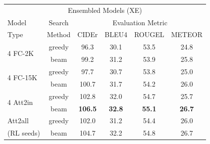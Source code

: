 \documentclass[10pt,twocolumn,letterpaper]{article}
\begin{document}
\begin{table}[t]

\small\addtolength{\tabcolsep}{-2.0pt} 
\begin{tabular}{l|c|cccc}
\hline \hline
\multicolumn{6}{c}{\multirow{2}{*}{Ensembled Models (XE)}} \\
\multicolumn{6}{c}{}\\
\hline
Model &  Search & \multicolumn{4}{c}{Evaluation Metric} \\
 Type & Method & CIDEr & BLEU4 & ROUGEL & METEOR  \\

\hline
\multirow{2}{*}{4 FC-2K } & greedy & 96.3 & 30.1 & 53.5 & 24.8 \\
	& beam  & 99.2 &  31.2 & 53.9 & 25.8  \\ %
\hline
 \multirow{2}{*}{4 FC-15K } & greedy & 97.7 & 30.7 & 53.8 & 25.0 \\
 &  beam & 100.7 &  31.7 & 54.2 &  26.0 \\ %
\hline
\multirow{2}{*}{4 Att2in } & greedy & 102.8 & 32.0 & 54.7 & 25.7 \\ 
 & beam & \bf{106.5} & \bf{32.8} & \bf{55.1} & \bf{26.7}  \\ %
\hline
Att2all & greedy & 102.0 & 31.2 & 54.4 & 26.0 \\
 (RL seeds) & beam & 104.7 & 32.2 & 54.8 & 26.7 \\


\end{tabular}
\end{table}
\end{document}
